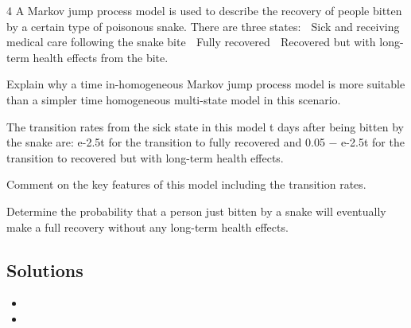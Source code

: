 \documentclass[a4paper,12pt]{article}
\begin{document}



4 A Markov jump process model is used to describe the recovery of people bitten by a
certain type of poisonous snake. There are three states:
 Sick and receiving medical care following the snake bite
 Fully recovered
 Recovered but with long-term health effects from the bite.
\item   Explain why a time in-homogeneous Markov jump process model is more
suitable than a simpler time homogeneous multi-state model in this scenario.

The transition rates from the sick state in this model t days after being bitten by the
snake are:
e-2.5t for the transition to fully recovered and
0.05 − e-2.5t for the transition to recovered but with long-term health effects.
\item   Comment on the key features of this model including the transition rates. 
\item  Determine the probability that a person just bitten by a snake will eventually
make a full recovery without any long-term health effects. 

\subsection*{Solutions}

\begin{itemize}
\item
\item
\end{itemize}
\end{document}
